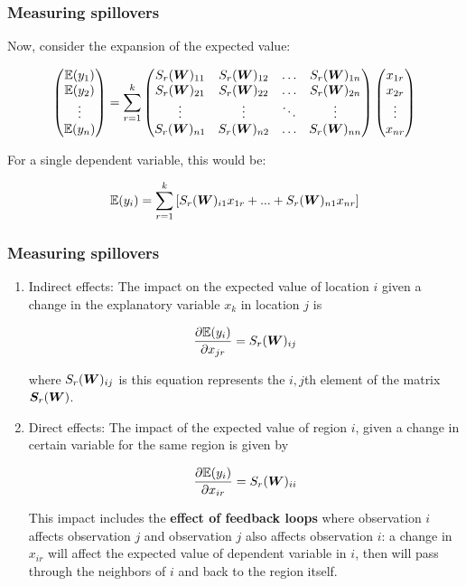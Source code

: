 \documentclass[english,10pt]{beamer}\usepackage[]{graphicx}\usepackage[]{xcolor}
\begin{document}
\begin{frame}
  \frametitle{Measuring spillovers}
  Now, consider the expansion of the expected value:


\begin{equation}
\begin{pmatrix}
\mathbb{E}(y_1) \\ \mathbb{E}(y_2) \\ \vdots \\ \mathbb{E}(y_n)
\end{pmatrix}
=
\sum_{r=1}^k\begin{pmatrix}
S_r(\bm W)_{11} & S_r(\bm W)_{12} & \hdots & S_r(\bm W)_{1n} \\
S_r(\bm W)_{21} & S_r(\bm W)_{22} & \hdots & S_r(\bm W)_{2n} \\
\vdots & \vdots & \ddots & \vdots \\ 
S_r(\bm W)_{n1} & S_r(\bm W)_{n2} & \hdots & S_r(\bm W)_{nn} 
\end{pmatrix}
\begin{pmatrix}
x_{1r} \\ x_{2r} \\ \vdots \\ x_{nr} 
\end{pmatrix}
\end{equation}

For a single dependent variable, this would be:


\begin{equation}
\mathbb{E}(y_i) = \sum_{r=1}^k\left[S_r(\bm W)_{i1}x_{1r} + ... + S_r(\bm W)_{n1}x_{nr}\right]
\end{equation}
\end{frame}


\begin{frame}
\frametitle{Measuring spillovers}

\begin{enumerate}
  \item Indirect effects: The impact on the expected value of location $i$ given a change in the explanatory variable $x_k$ in location $j$ is 

\begin{equation}
\frac{\partial \mathbb{E}(y_i)}{\partial x_{jr}} = S_r(\bm W)_{ij}
\end{equation}

where $S_r(\bm W)_{ij}$ is this equation represents the $i,j$th element of the matrix $\bm S_r(\bm W)$.

\item Direct effects: The impact of the expected value of region $i$, given a change in certain variable for the same region is given by

\begin{equation}
\frac{\partial \mathbb{E}(y_i)}{\partial x_{ir}} = S_r(\bm W)_{ii}
\end{equation}

This impact includes the \textbf{effect of feedback loops} where observation $i$ affects observation $j$ and observation $j$ also affects observation $i$: a change in $x_{ir}$ will affect the expected value of dependent variable in $i$, then will pass through the neighbors of $i$ and back to the region itself.
\end{enumerate}
\end{frame}
\end{document}
